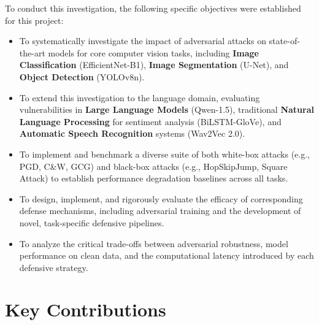 \documentclass[../main.tex]{subfiles}
\begin{document}
To conduct this investigation, the following specific objectives were established for this project:
\begin{itemize}
    \item To systematically investigate the impact of adversarial attacks on state-of-the-art models for core computer vision tasks, including \textbf{Image Classification} (EfficientNet-B1), \textbf{Image Segmentation} (U-Net), and \textbf{Object Detection} (YOLOv8n).
    \item To extend this investigation to the language domain, evaluating vulnerabilities in \textbf{Large Language Models} (Qwen-1.5), traditional \textbf{Natural Language Processing} for sentiment analysis (BiLSTM-GloVe), and \textbf{Automatic Speech Recognition} systems (Wav2Vec 2.0).
    \item To implement and benchmark a diverse suite of both white-box attacks (e.g., PGD, C\&W, GCG) and black-box attacks (e.g., HopSkipJump, Square Attack) to establish performance degradation baselines across all tasks.
    \item To design, implement, and rigorously evaluate the efficacy of corresponding defense mechanisms, including adversarial training and the development of novel, task-specific defensive pipelines.
    \item To analyze the critical trade-offs between adversarial robustness, model performance on clean data, and the computational latency introduced by each defensive strategy.
\end{itemize}


\section{Key Contributions}
\label{sec:key_contributions}
\end{document}
